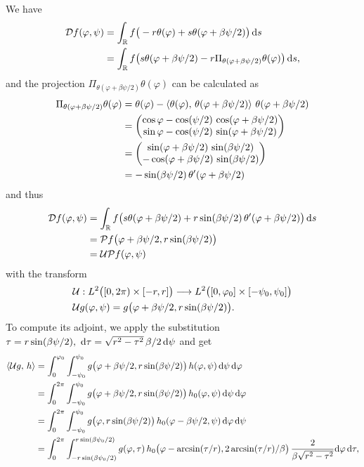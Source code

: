 \documentclass{amsart}
\renewcommand*{\phi}{\varphi}
\begin{document}
%
We have
%
\begin{align*}
 \OPD f(\phi, \psi) 
 &= \int_\RR f\big(- r\theta(\phi) + s \theta(\phi + \beta\psi/2)\big)\, \D s \\
 &= \int_\RR f\big(s \theta(\phi + \beta\psi/2) - r \Pi_{\theta(\phi + \beta\psi/2)}\theta(\phi) \big)\, \D s,
\end{align*}
%
and the projection $\Pi_{\theta(\phi + \beta\psi/2)}\theta(\phi)$ can be calculated as
%
\begin{align*}
 \Pi_{\theta(\phi + \beta\psi/2)}\theta(\phi)
 &= \theta(\phi) - \INNERLR{\theta(\phi)}{\theta(\phi + \beta\psi/2)}\, \theta(\phi + \beta\psi/2) \\
 &=
 \begin{pmatrix}
  \cos\phi - \cos(\psi/2)\, \cos(\phi + \beta\psi/2) \\
  \sin\phi - \cos(\psi/2)\, \sin(\phi + \beta\psi/2)
 \end{pmatrix} \\
 &=
 \begin{pmatrix}
  \sin(\phi + \beta\psi/2)\, \sin(\beta\psi/2) \\
  -\cos(\phi + \beta\psi/2)\, \sin(\beta\psi/2)
 \end{pmatrix} \\
 &= -\sin(\beta\psi/2)\, \theta'(\phi + \beta\psi/2)
\end{align*}
%
and thus 
%
\begin{align*}
 \OPD f(\phi, \psi)
 &= \int_\RR f\big(s \theta(\phi + \beta\psi/2) + r \sin(\beta\psi/2)\, \theta'(\phi + \beta\psi/2) \big)\, \D s \\
 &= \OPP f\big(\phi + \beta\psi/2, r\sin(\beta\psi/2)\big) \\
 &= \OPU \OPP f(\phi, \psi)
\end{align*}
%
with the transform
%
\begin{align}
 &\OPU: L^2\big([0,2\pi) \times [-r,r]\big) \Lto L^2\big([0,\phi_0] \times [-\psi_0,\psi_0]\big) \notag \\
 \label{eq:fanbeam_unit_trafo}
 &\OPU g(\phi, \psi) = g\big(\phi + \beta\psi/2, r\sin(\beta\psi/2)\big).
\end{align} 
%
To compute its adjoint, we apply the substitution $\tau = r\sin(\beta\psi/2),\ \mathrm{d}\tau = \sqrt{r^2-\tau^2}\, \beta/2\, \mathrm{d} \psi$ and get
%
\begin{align*}
 \INNER{\OPU g}{h} 
 &= \int_0^{\phi_0} \int_{-\psi_0}^{\psi_0} g\big(\phi + \beta\psi/2, r\sin(\beta\psi/2)\big)\, h(\phi, \psi)\, \D\psi\, \D\phi \\
 &= \int_0^{2\pi} \int_{-\psi_0}^{\psi_0} g\big(\phi + \beta\psi/2, r\sin(\beta\psi/2)\big)\, h_0(\phi, \psi)\, \D\psi\, \D\phi \\
 &= \int_0^{2\pi} \int_{-\psi_0}^{\psi_0} g\big(\phi, r\sin(\beta\psi/2)\big)\, h_0(\phi - \beta\psi/2, \psi)\, \D\phi\, \D\psi \\
 &= \int_0^{2\pi} \int_{-r\sin(\beta\psi_0/2)}^{r\sin(\beta\psi_0/2)} g(\phi, \tau)\, h_0\big(\phi - \arcsin(\tau/r), 
 2\arcsin(\tau/r)/\beta\big)\, \frac{2}{\beta\sqrt{r^2-\tau^2}} \D\phi\, \D\tau,
\end{align*}
\end{document}
